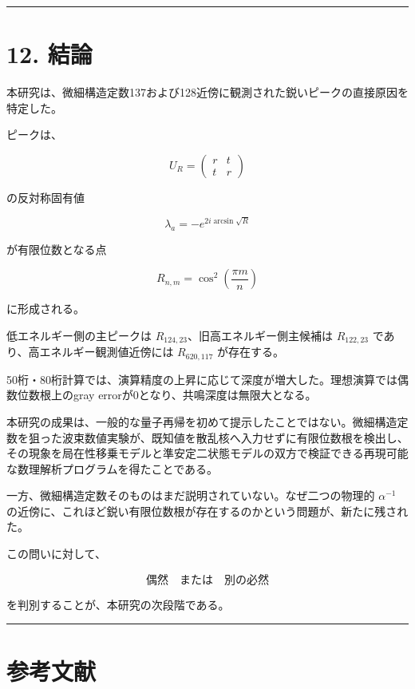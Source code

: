 \documentclass[
  10pt,
  a4paper,
]{article}
\begin{document}
\begin{center}\rule{0.5\linewidth}{0.5pt}\end{center}

\section{12. 結論}\label{ux7d50ux8ad6}

本研究は、微細構造定数137および128近傍に観測された鋭いピークの直接原因を特定した。

ピークは、

\[
U_R=
\begin{pmatrix}
r&t\\t&r
\end{pmatrix}
\]

の反対称固有値

\[
\lambda_a=-e^{2i\arcsin\sqrt R}
\]

が有限位数となる点

\[
R_{n,m}
=\cos^2\left(\frac{\pi m}{n}\right)
\]

に形成される。

低エネルギー側の主ピークは \(R_{124,23}\)、旧高エネルギー側主候補は
\(R_{122,23}\) であり、高エネルギー観測値近傍には \(R_{620,117}\)
が存在する。

50桁・80桁計算では、演算精度の上昇に応じて深度が増大した。理想演算では偶数位数根上のgray
errorが0となり、共鳴深度は無限大となる。

本研究の成果は、一般的な量子再帰を初めて提示したことではない。微細構造定数を狙った波束数値実験が、既知値を散乱核へ入力せずに有限位数根を検出し、その現象を局在性移乗モデルと準安定二状態モデルの双方で検証できる再現可能な数理解析プログラムを得たことである。

一方、微細構造定数そのものはまだ説明されていない。なぜ二つの物理的
\(\alpha^{-1}\)
の近傍に、これほど鋭い有限位数根が存在するのかという問題が、新たに残された。

この問いに対して、

\[
\text{偶然}
\quad\text{または}\quad
\text{別の必然}
\]

を判別することが、本研究の次段階である。

\begin{center}\rule{0.5\linewidth}{0.5pt}\end{center}

\section{参考文献}\label{ux53c2ux8003ux6587ux732e}
\end{document}
